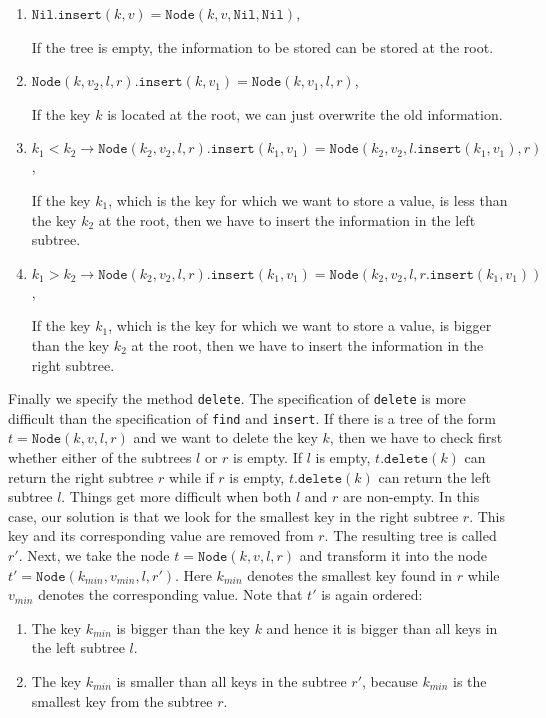 \begin{enumerate}
\item $\texttt{Nil}.\texttt{insert}(k,v) = \texttt{Node}(k,v, \texttt{Nil}, \texttt{Nil})$,
  
      If the tree is empty, the information to be stored can be stored at the root.
\item $\texttt{Node}(k,v_2,l,r).\texttt{insert}(k,v_1) = \texttt{Node}(k, v_1, l, r)$,

      If the key $k$ is located at the root, we can just overwrite the old information. 
\item $k_1 < k_2 \rightarrow 
         \texttt{Node}(k_2, v_2, l, r).\texttt{insert}(k_1, v_1) = \texttt{Node}(k_2, v_2, l.\texttt{insert}(k_1, v_1), r)$,

      If the key $k_1$, which is the key for which we want to store a value, is less than the key
      $k_2$ at the root, then we have to insert the information in the left subtree.
\item $k_1 > k_2 \rightarrow 
         \texttt{Node}(k_2, v_2, l, r).\texttt{insert}(k_1, v_1) = 
         \texttt{Node}(k_2, v_2, l, r.\texttt{insert}(k_1, v_1))$,

      If the key $k_1$, which is the key for which we want to store a value, is bigger than the key
      $k_2$ at the root, then we have to insert the information in the right subtree.
\end{enumerate}
Finally we specify the method  \texttt{delete}.  The specification of \texttt{delete} is more
difficult than the specification of \texttt{find} and \texttt{insert}.
If there is a tree of the form $t =\texttt{Node}(k,v,l,r)$ and we want to delete the key $k$, then
we have to check first whether either of the subtrees  $l$ or $r$ is empty.  If $l$ is empty,
$t.\texttt{delete}(k)$ can return the right subtree  $r$ while if $r$ is empty,
$t.\texttt{delete}(k)$ can return the left subtree $l$.
Things get more difficult when both $l$ and $r$ are non-empty.  In this case,
our solution is that we look for the smallest key in the right subtree $r$.
This key and its corresponding value are removed from $r$.  The resulting tree is called $r'$.
Next, we take the node $t =\texttt{Node}(k,v,l,r)$ and transform it into the node
$t'=\texttt{Node}(k_{min},v_{min},l,r')$.  Here $k_{min}$ denotes the smallest key found in $r$ while
$v_{min}$ denotes the corresponding value.  Note that $t'$ is again ordered:
\begin{enumerate}
\item The key $k_{min}$ is bigger than the key $k$ and hence it is bigger than all keys in the left
      subtree $l$.
\item The key $k_{min}$ is smaller than all keys in the subtree  $r'$, because $k_{min}$ is the
      smallest key from the subtree $r$.
\end{enumerate}
